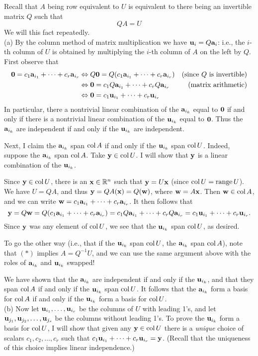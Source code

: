 \ee
\begin{solution}
\noindent
Recall that $A$ being row equivalent to $U$ is equivalent to there being an invertible matrix $Q$ such that 
\[
QA=U\tag{$*$}
\]
We will this fact repeatedly. 
\\
(a) By the column method of matrix multiplication we have ${\mathbf u}_i=Q{\mathbf a}_i$: i.e., the $i$-th column of $U$ is obtained by multiplying the $i$-th column of $A$ on the left by $Q$. First observe that 
\begin{align*}
{\mathbf 0}=c_1{\mathbf a}_{i_1}+\cdots +c_r{\mathbf a}_{i_r}&\Leftrightarrow Q{\mathbf 0}=Q(c_1{\mathbf a}_{i_1}+\cdots +c_r{\mathbf a}_{i_r}) &\text{(since $Q$ is invertible)}\\
&\Leftrightarrow {\mathbf 0}=c_1Q{\mathbf a}_{i_1}+\cdots +c_rQ{\mathbf a}_{i_r} &\text{(matrix arithmetic)}\\
&\Leftrightarrow {\mathbf 0}=c_1{\mathbf u}_{i_1}+\cdots +c_r{\mathbf u}_{i_r}
\end{align*}
In particular, there a nontrivial linear combination of the ${\mathbf a}_{i_k}$ equal to ${\mathbf 0}$ if and only if there is a nontrivial linear combination of the ${\mathbf u}_{i_k}$ equal to ${\mathbf 0}$. Thus the ${\mathbf a}_{i_k}$ are independent if and only if the ${\mathbf u}_{i_k}$ are independent. 

Next, I claim the ${\mathbf a}_{i_k}$ span $\operatorname{col} A$ if and only if the  ${\mathbf u}_{i_k}$ span $\operatorname{col} U$. Indeed, suppose the ${\mathbf a}_{i_k}$ span $\operatorname{col} A$. Take ${\mathbf y}\in \operatorname{col} U$. I will show that ${\mathbf y}$ is a linear combination of the ${\mathbf u}_{i_k}$. 

Since ${\mathbf y}\in \operatorname{col} U$, there is an ${\mathbf x}\in{\mathbb R}^n$ such that ${\mathbf y}=U{\mathbf x}$ (since $\operatorname{col} U=\operatorname{range} U$). We have $U=QA$, and thus ${\mathbf y}=QA({\mathbf x})=Q({\mathbf w})$, where ${\mathbf w}=A{\mathbf x}$. Then ${\mathbf w}\in \operatorname{col} A$, and we can write ${\mathbf w}=c_1{\mathbf a}_{i_1}+\cdots +c_r{\mathbf a}_{i_r}$. It then follows that 
\[
{\mathbf y}=Q{\mathbf w}=Q(c_1{\mathbf a}_{i_1}+\cdots +c_r{\mathbf a}_{i_r})=c_1Q{\mathbf a}_{i_1}+\cdots +c_rQ{\mathbf a}_{i_r}=c_1{\mathbf u}_{i_1}+\cdots +c_r{\mathbf u}_{i_r}.
\]
Since ${\mathbf y}$ was any element of $\operatorname{col} U$, we see that the ${\mathbf u}_{i_k}$ span $\operatorname{col} U$, as desired. 

To go the other way (i.e., that if the ${\mathbf u}_{i_k}$ span $\operatorname{col} U$,  the ${\mathbf a}_{i_k}$ span $\operatorname{col} A$), note that $(*)$ implies $A=Q^{-1}U$, and we can use the same argument above with the roles of ${\mathbf a}_{i_k}$ and ${\mathbf u}_{i_k}$ swapped! 

We have shown that the ${\mathbf a}_{i_k}$ are independent if and only if the ${\mathbf u}_{i_k}$, and that they span $\operatorname{col} A$ if and only if the ${\mathbf u}_{i_k}$ span $\operatorname{col} U$. It follows that the ${\mathbf a}_{i_k}$ form a basis for $\operatorname{col} A$ if and only if the ${\mathbf u}_{i_k}$ form a basis for $\operatorname{col} U$. 
\\
(b) Now let ${\mathbf u}_{i_1},\dots, {\mathbf u}_{i_r}$ be the columns of $U$ with leading 1's, and let ${\mathbf u}_{j_1}, {\mathbf u}_{j_2}, \dots, {\mathbf u}_{j_s}$ be the columns without leading 1's. To prove the ${\mathbf u}_{i_k}$ form a basis for $\operatorname{col} U$, I will show that given any ${\mathbf y}\in \operatorname{col} U$ there is a {\em unique} choice of scalars $c_1, c_2,\dots, c_r$ such that $c_1{\mathbf u}_{i_1}+\cdots +c_r{\mathbf u}_{i_r}={\mathbf y}$. (Recall that the uniqueness of this choice implies linear independence.) 


\end{solution}
